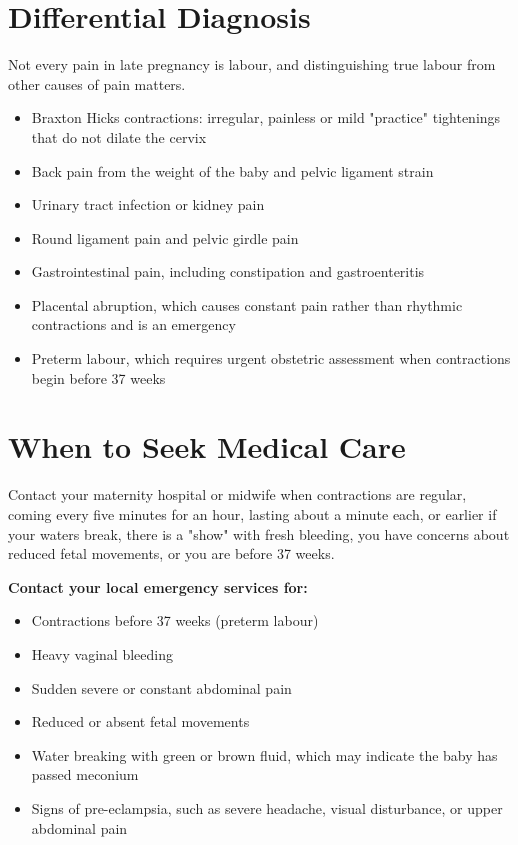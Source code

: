 \section*{Differential Diagnosis}
Not every pain in late pregnancy is labour, and distinguishing true labour from other causes of pain matters.

\begin{itemize}
    \item Braxton Hicks contractions: irregular, painless or mild "practice" tightenings that do not dilate the cervix
    \item Back pain from the weight of the baby and pelvic ligament strain
    \item Urinary tract infection or kidney pain
    \item Round ligament pain and pelvic girdle pain
    \item Gastrointestinal pain, including constipation and gastroenteritis
    \item Placental abruption, which causes constant pain rather than rhythmic contractions and is an emergency
    \item Preterm labour, which requires urgent obstetric assessment when contractions begin before 37 weeks
\end{itemize}

\section*{When to Seek Medical Care}
Contact your maternity hospital or midwife when contractions are regular, coming every five minutes for an hour, lasting about a minute each, or earlier if your waters break, there is a "show" with fresh bleeding, you have concerns about reduced fetal movements, or you are before 37 weeks.

\textbf{Contact your local emergency services for:}
\begin{itemize}
    \item Contractions before 37 weeks (preterm labour)
    \item Heavy vaginal bleeding
    \item Sudden severe or constant abdominal pain
    \item Reduced or absent fetal movements
    \item Water breaking with green or brown fluid, which may indicate the baby has passed meconium
    \item Signs of pre-eclampsia, such as severe headache, visual disturbance, or upper abdominal pain
\end{itemize}

